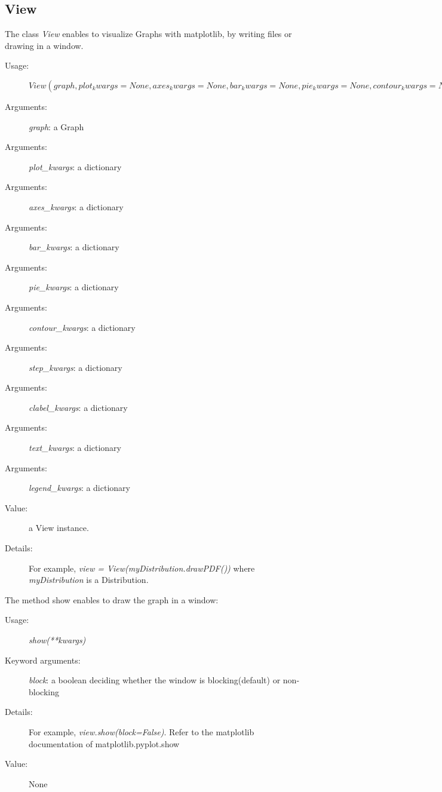 \newpage
\subsection{View}

The class {\itshape View} enables to visualize Graphs with matplotlib, by writing files or drawing in a window.
\begin{description}
\item[Usage:] $View(graph, plot_kwargs=None, axes_kwargs=None, bar_kwargs=None, pie_kwargs=None,
  contour_kwargs=None, step_kwargs=None, clabel_kwargs, text_kwargs, legend_kwargs)$

\item[Arguments:] \textit{graph}: a Graph
\item[Arguments:] \textit{plot\_kwargs}: a dictionary
\item[Arguments:] \textit{axes\_kwargs}: a dictionary
\item[Arguments:] \textit{bar\_kwargs}: a dictionary
\item[Arguments:] \textit{pie\_kwargs}: a dictionary
\item[Arguments:] \textit{contour\_kwargs}: a dictionary
\item[Arguments:] \textit{step\_kwargs}: a dictionary
\item[Arguments:] \textit{clabel\_kwargs}: a dictionary
\item[Arguments:] \textit{text\_kwargs}: a dictionary
\item[Arguments:] \textit{legend\_kwargs}: a dictionary

\item[Value:] a View instance.
\item[Details:] For example, \textit{view = View(myDistribution.drawPDF())} where \textit{myDistribution} is a Distribution.
\end{description}

The method show enables to draw the graph in a window:
\begin{description}
\item[Usage:] \textit{show(**kwargs)}
\item[Keyword arguments:] \textit{block}: a boolean deciding whether the window is blocking(default) or non-blocking
\item[Details:] For example, \textit{view.show(block=False)}. Refer to the matplotlib documentation of matplotlib.pyplot.show
\item[Value:] None
\end{description}


